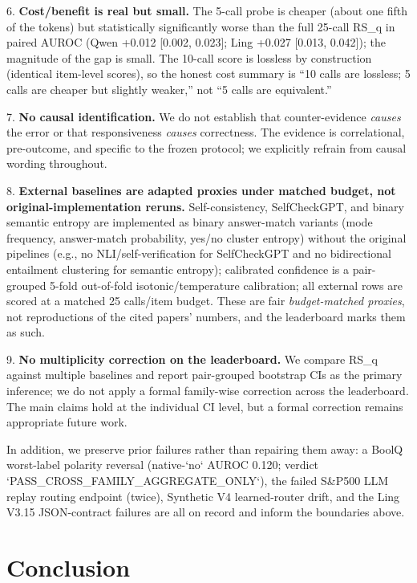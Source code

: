 \documentclass[11pt]{article}
\begin{document}
6. \textbf{Cost/benefit is real but small.}
   The 5-call probe is cheaper (about one fifth of the tokens) but statistically significantly worse than the full 25-call RS\_q in paired AUROC (Qwen +0.012 [0.002, 0.023]; Ling +0.027 [0.013, 0.042]); the magnitude of the gap is small. The 10-call score is lossless by construction (identical item-level scores), so the honest cost summary is “10 calls are lossless; 5 calls are cheaper but slightly weaker,” not “5 calls are equivalent.”

7. \textbf{No causal identification.}
   We do not establish that counter-evidence \emph{causes} the error or that responsiveness \emph{causes} correctness. The evidence is correlational, pre-outcome, and specific to the frozen protocol; we explicitly refrain from causal wording throughout.

8. \textbf{External baselines are adapted proxies under matched budget, not original-implementation reruns.}
   Self-consistency, SelfCheckGPT, and binary semantic entropy are implemented as binary answer-match variants (mode frequency, answer-match probability, yes/no cluster entropy) without the original pipelines (e.g., no NLI/self-verification for SelfCheckGPT and no bidirectional entailment clustering for semantic entropy); calibrated confidence is a pair-grouped 5-fold out-of-fold isotonic/temperature calibration; all external rows are scored at a matched 25 calls/item budget. These are fair \emph{budget-matched proxies}, not reproductions of the cited papers' numbers, and the leaderboard marks them as such.

9. \textbf{No multiplicity correction on the leaderboard.}
   We compare RS\_q against multiple baselines and report pair-grouped bootstrap CIs as the primary inference; we do not apply a formal family-wise correction across the leaderboard. The main claims hold at the individual CI level, but a formal correction remains appropriate future work.

In addition, we preserve prior failures rather than repairing them away: a BoolQ worst-label polarity reversal (native-`no` AUROC 0.120; verdict `PASS\_CROSS\_FAMILY\_AGGREGATE\_ONLY`), the failed S\&P500 LLM replay routing endpoint (twice), Synthetic V4 learned-router drift, and the Ling V3.15 JSON-contract failures are all on record and inform the boundaries above.

\section{Conclusion}
\end{document}
